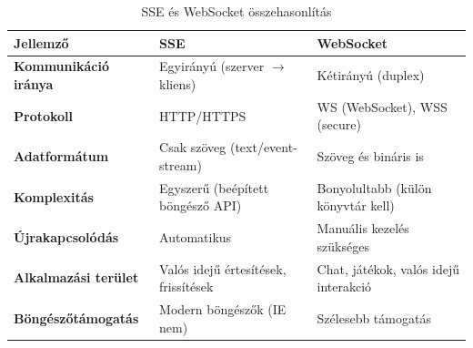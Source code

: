 \documentclass{thesis-ekf}
\theoremstyle{definition}
\theoremstyle{remark}
\begin{document}
	\begin{table}[!h]
		\centering
		\caption{SSE és WebSocket összehasonlítás}
		\label{tab_sse_v_websocket}
		\begin{tabular}{|l|l|p{5cm}|}
			\hline
			\textbf{Jellemző}         & \textbf{SSE}                          & \textbf{WebSocket}                  \\ \hline
			\textbf{Kommunikáció iránya}       & Egyirányú (szerver $\rightarrow$ kliens) & Kétirányú (duplex)                  \\ \hline
			\textbf{Protokoll}                 & HTTP/HTTPS                            & WS (WebSocket), WSS (secure)        \\ \hline
			\textbf{Adatformátum}              & Csak szöveg (text/event-stream)       & Szöveg és bináris is                \\ \hline
			\textbf{Komplexitás}               & Egyszerű (beépített böngésző API)     & Bonyolultabb (külön könyvtár kell)  \\ \hline
			\textbf{Újrakapcsolódás}           & Automatikus                           & Manuális kezelés szükséges          \\ \hline
			\textbf{Alkalmazási terület}       & Valós idejű értesítések, frissítések  & Chat, játékok, valós idejű interakció \\ \hline
			\textbf{Böngészőtámogatás}        & Modern böngészők (IE nem)            & Szélesebb támogatás                 \\ \hline
		\end{tabular}
	\end{table}
	\FloatBarrier
\end{document}
